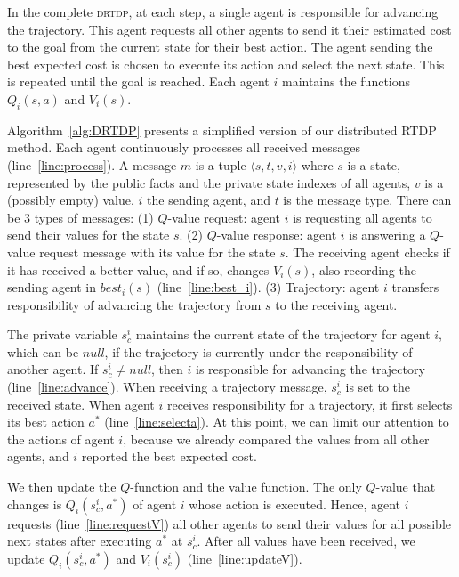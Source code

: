\documentclass[letterpaper]{article} %
\newcommand{\drtdp}{\textsc {drtdp}\xspace}
\theoremstyle{remark}
\begin{document}
In the complete \drtdp, at each step, a single agent is responsible for advancing the trajectory. This agent requests all other agents to send it their estimated cost to the goal from the current state for their best action. The agent sending the best expected cost is chosen to execute its action and select the next state. This is repeated until the goal is reached.
Each agent $i$ maintains the functions $Q_i(s,a)$ and $V_i(s)$.

Algorithm~\ref{alg:DRTDP} presents a simplified version of our distributed RTDP method. Each agent continuously processes all received messages (line~\ref{line:process}). A message $m$ is a tuple $\langle s, t, v, i \rangle$ where $s$ is a state, represented by the public facts and the private state indexes of all agents, $v$ is a (possibly empty) value, $i$ the sending agent, and $t$ is the message type.
There can be 3 types of messages:
(1) $Q$-value request: agent $i$ is requesting all agents to send their values for the state $s$.
(2) $Q$-value response: agent $i$ is answering a $Q$-value request message with its value for the state $s$. The receiving agent checks if it has received a better value, and if so, changes $V_i(s)$, also recording the sending agent in $best_i(s)$ (line~\ref{line:best_i}).
(3) Trajectory: agent $i$ transfers responsibility of advancing the trajectory from  $s$ to the receiving agent.

The private variable $s^i_c$ maintains the current state of the trajectory for agent $i$, which can be $null$, if the trajectory is currently under the responsibility of another agent. If $s^i_c \neq null$, then $i$ is responsible for advancing the trajectory (line~\ref{line:advance}). When receiving a trajectory message, $s^i_c$ is set to the received state.
When agent $i$ receives responsibility for a trajectory, it first selects its best action $a^*$ (line~\ref{line:selecta}). At this point, we can limit our attention to the actions of agent $i$, because we already compared the values from all other agents, and $i$ reported the best expected cost.

We then update the $Q$-function and the value function. The only $Q$-value that changes is $Q_i(s^i_c,a^*)$ of agent $i$ whose action is executed. Hence, agent $i$ requests (line~\ref{line:requestV}) all other agents to send their values for all possible next states after executing $a^*$ at $s^i_c$. After all values have been received, we update $Q_i(s^i_c,a^*)$ and $V_i(s^i_c)$ (line~\ref{line:updateV}).
\end{document}
